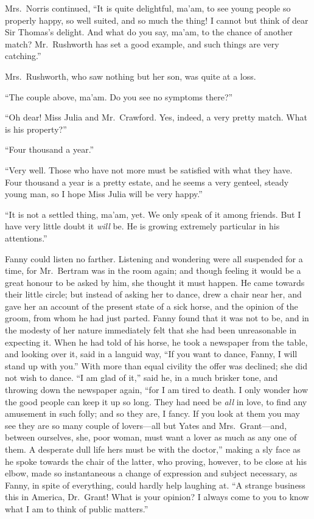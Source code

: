 Mrs.\ Norris continued, ``It is quite delightful, ma'am, to
see young people so properly happy, so well suited,
and so much the thing!  I cannot but think of dear Sir
Thomas's delight.  And what do you say, ma'am, to the chance
of another match?  Mr.\ Rushworth has set a good example,
and such things are very catching.''

Mrs.\ Rushworth, who saw nothing but her son, was quite
at a loss.

``The couple above, ma'am. Do you see no symptoms there?''

``Oh dear!  Miss Julia and Mr.\ Crawford.  Yes, indeed,
a very pretty match.  What is his property?''

``Four thousand a year.''

``Very well.  Those who have not more must be satisfied with
what they have.  Four thousand a year is a pretty estate,
and he seems a very genteel, steady young man, so I hope
Miss Julia will be very happy.''

``It is not a settled thing, ma'am, yet.  We only speak of it
among friends.  But I have very little doubt it \emph{will} be.
He is growing extremely particular in his attentions.''

Fanny could listen no farther.  Listening and wondering were all
suspended for a time, for Mr.\ Bertram was in the room again;
and though feeling it would be a great honour to be asked
by him, she thought it must happen.  He came towards
their little circle; but instead of asking her to dance,
drew a chair near her, and gave her an account of the present
state of a sick horse, and the opinion of the groom,
from whom he had just parted.  Fanny found that it was
not to be, and in the modesty of her nature immediately
felt that she had been unreasonable in expecting it.
When he had told of his horse, he took a newspaper from
the table, and looking over it, said in a languid way,
``If you want to dance, Fanny, I will stand up with you.''
With more than equal civility the offer was declined;
she did not wish to dance.  ``I am glad of it,'' said he,
in a much brisker tone, and throwing down the newspaper
again, ``for I am tired to death.  I only wonder how
the good people can keep it up so long.  They had need
be \emph{all} in love, to find any amusement in such folly;
and so they are, I fancy.  If you look at them you may
see they are so many couple of lovers---all but Yates
and Mrs.\ Grant---and, between ourselves, she, poor woman,
must want a lover as much as any one of them.  A desperate
dull life hers must be with the doctor,'' making a sly face
as he spoke towards the chair of the latter, who proving,
however, to be close at his elbow, made so instantaneous
a change of expression and subject necessary, as Fanny,
in spite of everything, could hardly help laughing at.
``A strange business this in America, Dr.\ Grant!  What is
your opinion?  I always come to you to know what I am to
think of public matters.''

